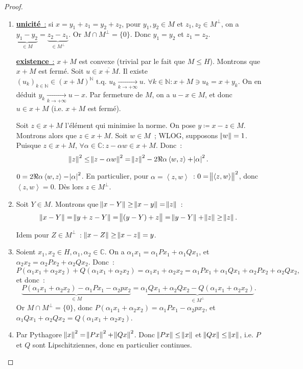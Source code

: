 \documentclass{report}
\newcommand{\C}{{\mathbb C}}
\newcommand{\N}{{\mathbb N}}
\newcommand{\scpr}[2]{\left\langle#1, #2\right\rangle}
\newcommand{\tq}{\text{ t.q. }}
\newcommand{\pinfty}{{+\infty}}
\newcommand{\unic}{{\underline {\textbf{unicité}~:}} }
\newcommand{\exis}{{\underline {\textbf{existence}~:}} }
\theoremstyle{definition}
\theoremstyle{remark}
\begin{document}
\begin{proof}~
\begin{enumerate}
	\item \unic si $x = y_1+z_1 = y_2+z_2$, pour $y_1,y_2 \in M$ et $z_1,z_2 \in M^\perp$, on a
	$\underbrace {y_1-y_2}_{\in M} = \underbrace {z_2-z_1}_{\in M^\perp}$. Or $M \cap M^\perp = \{0\}$. Donc $y_1=y_2$ et $z_1=z_2$.

 	\exis $x+M$ est convexe (trivial par le fait que $M \leq H$). Montrons que $x+M$ est fermé. Soit $u \in \overline {x+M}$.
	Il existe $(u_k)_{k \in \N} \in {(x+M)^\N} \tq u_k \xrightarrow[k \to \pinfty]{} u$. $\forall k \in \N : x+M \ni u_k = x + y_k$. On en déduit
	$y_k \xrightarrow[k \to \pinfty]{} u-x$. Par fermeture de $M$, on a $u-x \in M$, et donc $u \in x+M$ (i.e. $x+M$ est fermé).

	Soit $z \in x+M$ l'élément qui minimise la norme. On pose $y \coloneqq x-z \in M$. Montrons alors que $z \in x+M$. Soit $w \in M$~; WLOG, supposons $\norm w = 1$.
	Puisque $z \in x+M$, $\forall \alpha \in \C : z-\alpha w \in x+M$. Donc~:
	\[\norm z^2 \leq \norm {z-\alpha w}^2 = \norm z^2 - 2\Re\alpha\scpr wz + \abs\alpha^2.\]

	$0 = 2\Re\alpha\scpr wz - \abs\alpha^2$. En particulier, pour $\alpha = \scpr zw$~: $0 = \norm {\scpr zw}^2$, donc $\scpr zw = 0$. Dès lors $z \in M^\perp$.

	\item Soit $Y \in M$. Montrons que $\norm {x-Y} \geq \norm {x-y} = \norm z$~:
	\[\norm {x-Y} = \norm {y+z-Y} = \norm {(y-Y) + z} = \norm {y-Y} + \norm z \geq \norm z.\]

	Idem pour $Z \in M^\perp$~: $\norm {x-Z} \geq \norm {x-z} = y$.

	\item Soient $x_1, x_2 \in H, \alpha_1, \alpha_2 \in \C$. On a $\alpha_1x_1 = \alpha_1Px_1 + \alpha_1Qx_1$, et $\alpha_2x_2 = \alpha_2Px_2 + \alpha_2Qx_2$. Donc~:
	\[P(\alpha_1x_1+\alpha_2x_2) + Q(\alpha_1x_1 + \alpha_2x_2) = \alpha_1x_1 + \alpha_2x_2 = \alpha_1Px_1 + \alpha_1Qx_1 + \alpha_2Px_2 + \alpha_2Qx_2,\]
	et donc~:
	\[\underbrace {P(\alpha_1x_1+\alpha_2x_2) - \alpha_1Px_1 - \alpha_2px_2}_{\in M} = \underbrace {\alpha_1Qx_1 + \alpha_2Qx_2 - Q(\alpha_1x_1 + \alpha_2x_2)}_{\in M^\perp}.\]
	Or $M \cap M^\perp = \{0\}$, donc $P(\alpha_1x_1+\alpha_2x_2) = \alpha_1Px_1 - \alpha_2px_2$, et $\alpha_1Qx_1 + \alpha_2Qx_2 = Q(\alpha_1x_1 + \alpha_2x_2)$.

	\item Par Pythagore $\norm x^2 = \norm {Px}^2 + \norm {Qx}^2$. Donc $\norm {Px} \leq \norm x$ et $\norm {Qx} \leq \norm x$, i.e. $P$ et $Q$ sont Lipschitziennes,
	donc en particulier continues.
\end{enumerate}
\end{proof}
\end{document}
